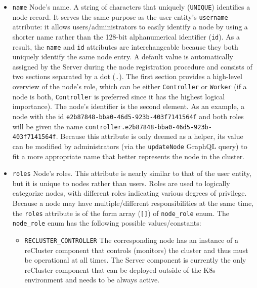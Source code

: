 \begin{itemize}
  \item \texttt{name}
    \newline
    Node's name.
    \newline
    A string of characters that uniquely (\texttt{UNIQUE}) identifies a node
    record.
    \newline
    It serves the same purpose as the user entity's \texttt{username} attribute:
    it allows users/administrators to easily identify a node by using a shorter name
    rather than the 128-bit alphanumerical identifier (\texttt{id}). As a result,
    the \texttt{name} and \texttt{id} attributes are interchangeable because
    they both uniquely identify the same node entry.
    \newline
    A default value is automatically assigned by the Server during the node registration
    procedure and consists of two sections separated by a dot (\texttt{.}). The first
    section provides a high-level overview of the node's role, which can be
    either \texttt{Controller} or \texttt{Worker} (if a node is both, \texttt{Controller}
    is preferred since it has the highest logical importance). The node's identifier
    is the second element. As an example, a node with the id \texttt{e2b87848-bba0-46d5-923b-403f7141564f}
    and both roles will be given the name \texttt{controller.e2b87848-bba0-46d5-923b-403f7141564f}.
    \newline
    Because this attribute is only deemed as a helper, its value can be modified
    by administrators (via the \texttt{updateNode} GraphQL query) to fit a more
    appropriate name that better represents the node in the cluster.

  \item \texttt{roles}
    \newline
    Node's roles.
    \newline
    This attribute is nearly similar to that of the user entity, but it is
    unique to nodes rather than users. Roles are used to logically categorize nodes,
    with different roles indicating various degrees of privilege.
    \newline
    Because a node may have multiple/different responsibilities at the same time,
    the \texttt{roles} attribute is of the form array (\texttt{[]}) of \texttt{node\_role}
    enum.
    \newline
    The \texttt{node\_role} enum has the following possible values/constants:\

    \begin{itemize}
      \item \texttt{RECLUSTER\_CONTROLLER}
        \newline
        The corresponding node has an instance of a reCluster component that
        controls (monitors) the cluster and thus must be operational at all
        times.
        \newline
        The Server component is currently the only reCluster component that can be
        deployed outside of the K8s environment and needs to be always active.


\end{itemize}
\end{itemize}
